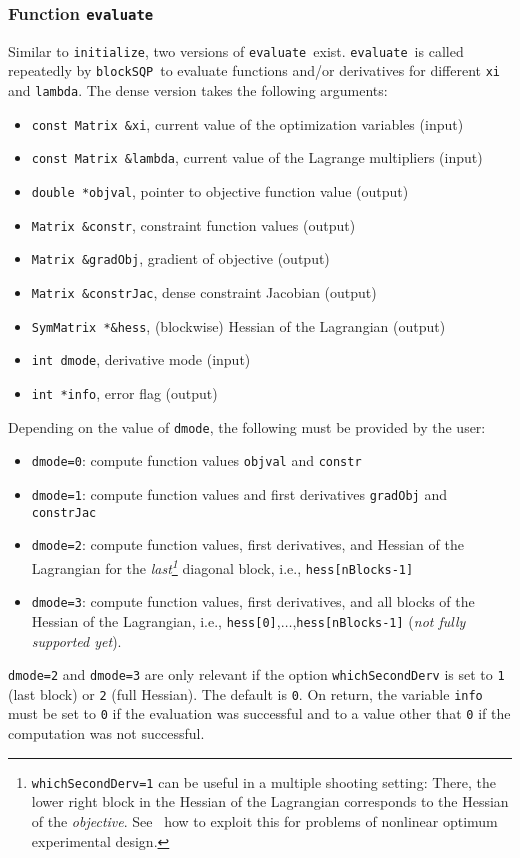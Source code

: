 \documentclass[	11pt,
				a4paper,
				abstract=true,
				twoside=true,
				bibliography=totoc, 
				headinclude=true,
				footinclude=false]{scrartcl}
\newcommand{\blockSQP}{\texttt{blockSQP}}
\newcommand{\init}{\texttt{initialize}}
\newcommand{\evaluate}{\texttt{evaluate}}
\begin{document}
\subsubsection{Function \evaluate}
Similar to \init, two versions of \evaluate\ exist. \evaluate\ is called repeatedly by \blockSQP\ to evaluate functions and/or derivatives for different \texttt{xi} and \texttt{lambda}. The dense version takes the following arguments:
\begin{itemize}
\item \texttt{const Matrix \&xi}, current value of the optimization variables (input)
\item \texttt{const Matrix \&lambda}, current value of the Lagrange multipliers (input)
\item \texttt{double *objval}, pointer to objective function value (output)
\item \texttt{Matrix \&constr}, constraint function values (output)
\item \texttt{Matrix \&gradObj}, gradient of objective (output)
\item \texttt{Matrix \&constrJac}, dense constraint Jacobian (output)
\item \texttt{SymMatrix *\&hess}, (blockwise) Hessian of the Lagrangian (output)
\item \texttt{int dmode}, derivative mode (input)
\item \texttt{int *info}, error flag (output)
\end{itemize}
Depending on the value of \texttt{dmode}, the following must be provided by the user:
\begin{itemize}
\item \texttt{dmode=0}: compute function values \texttt{objval} and \texttt{constr}
\item \texttt{dmode=1}: compute function values and first derivatives \texttt{gradObj} and \texttt{constrJac}
\item \texttt{dmode=2}: compute function values, first derivatives, and Hessian of the Lagrangian for the \emph{last\footnote{\texttt{whichSecondDerv=1} can be useful in a multiple shooting setting: There, the lower right block in the Hessian of the Lagrangian corresponds to the Hessian of the \emph{objective}. See~\cite{Janka2015} how to exploit this for problems of nonlinear optimum experimental design.}} diagonal block, i.e., \texttt{hess[nBlocks-1]}
\item \texttt{dmode=3}: compute function values, first derivatives, and all blocks of the Hessian of the Lagrangian, i.e., \texttt{hess[0]},$\dots$,\texttt{hess[nBlocks-1]} (\emph{not fully supported yet}).
\end{itemize}
\texttt{dmode=2} and \texttt{dmode=3} are only relevant if the option \texttt{whichSecondDerv} is set to \texttt{1} (last block) or \texttt{2} (full Hessian). The default is \texttt{0}.
On return, the variable \texttt{info} must be set to \texttt{0} if the evaluation was successful and to a value other that \texttt{0} if the computation was not successful.
\end{document}
